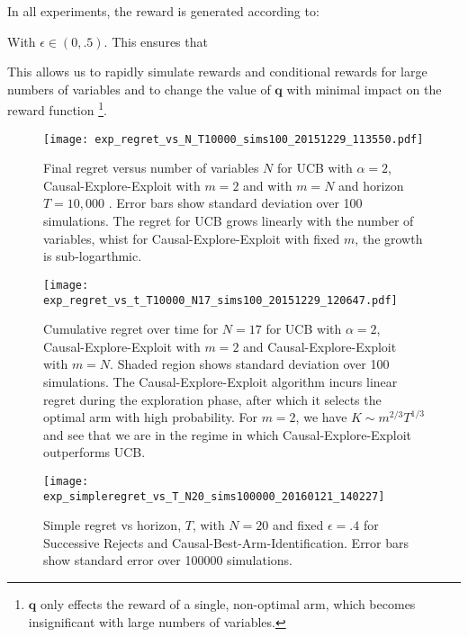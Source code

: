 In all experiments, the reward is generated according to:

With $\epsilon \in (0,.5)$. This ensures that 

This allows us to rapidly simulate rewards and conditional rewards for large numbers of variables and to change the value of $\boldsymbol{q}$ with minimal impact on the reward function \footnote{$\boldsymbol{q}$ only effects the reward of a single, non-optimal arm, which becomes insignificant with large numbers of variables.}. 

\begin{figure}
\caption{Final regret versus number of variables $N$ for UCB with $\alpha = 2$, Causal-Explore-Exploit with $m=2$ and with $m=N$ and horizon $T = 10,000$ . Error bars show standard deviation over 100 simulations. The regret for UCB grows linearly with the number of variables, whist for Causal-Explore-Exploit with fixed $m$, the growth is sub-logarthmic.  }
\label{fig:known_q_r_vs_N}
\centering
\texttt{[image: exp\_regret\_vs\_N\_T10000\_sims100\_20151229\_113550.pdf]}
\end{figure}

\begin{figure}
\caption{Cumulative regret over time for $N = 17$ for UCB with $\alpha=2$, Causal-Explore-Exploit with $m=2$ and Causal-Explore-Exploit with $m=N$. Shaded region shows standard deviation over 100 simulations. The Causal-Explore-Exploit algorithm incurs linear regret during the exploration phase, after which it selects the optimal arm with high probability. For $m=2$, we have $K \sim m^{2/3}T^{1/3}$ and see that we are in the regime in which Causal-Explore-Exploit outperforms UCB.}
\label{fig:known_q_r_vs_t}
\centering
\texttt{[image: exp\_regret\_vs\_t\_T10000\_N17\_sims100\_20151229\_120647.pdf]}
\end{figure}

\begin{figure}
\caption{Simple regret vs horizon, $T$, with $N = 20$ and fixed $\epsilon = .4$ for Successive Rejects and Causal-Best-Arm-Identification. Error bars show standard error over 100000 simulations.}
\label{fig:simple_vs_T}
\centering
\texttt{[image: exp\_simpleregret\_vs\_T\_N20\_sims100000\_20160121\_140227]}
\end{figure}

